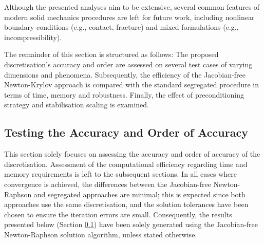 \documentclass[sn-mathphys,Numbered]{sn-jnl}%
\begin{document}
Although the presented analyses aim to be extensive, %
several common features of modern solid mechanics procedures are left for future work, including nonlinear boundary conditions (e.g., contact, fracture) and mixed formulations (e.g., incompressibility). %

The remainder of this section is structured as follows:
The proposed discretisation's accuracy and order are assessed on several test cases of varying dimensions and phenomena.
Subsequently, the efficiency of the Jacobian-free Newton-Krylov approach is compared with the standard segregated procedure in terms of time, memory and robustness. Finally, the effect of preconditioning strategy and stabilisation scaling is examined.


\subsection{Testing the Accuracy and Order of Accuracy}
\label{sec:accuracy}
This section solely focuses on assessing the accuracy and order of accuracy of the discretisation.
Assessment of the computational efficiency regarding time and memory requirements is left to the subsequent sections.
In all cases where convergence is achieved, the differences between the Jacobian-free Newton-Raphson and segregated approaches are minimal;
this is expected since both approaches use the same discretisation, and the solution tolerances have been chosen to ensure the iteration errors are small.
Consequently, the results presented below (Section \ref{sec:accuracy}) have been solely generated using the Jacobian-free Newton-Raphson solution algorithm, unless stated otherwise.
\end{document}
